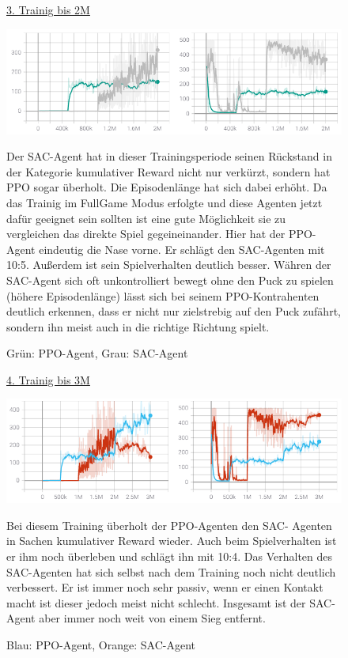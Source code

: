 \begin{figure} [h]
\underline{3. Trainig bis 2M} 

\includegraphics[width=\textwidth]{images/fullgame_erg}
\label{unity_agent}
\caption{Grün: PPO-Agent, Grau: SAC-Agent}


Der SAC-Agent hat in dieser Trainingsperiode seinen Rückstand in der Kategorie kumulativer Reward nicht nur verkürzt, sondern hat PPO sogar überholt. Die Episodenlänge hat sich dabei erhöht. Da das Trainig im FullGame Modus erfolgte und diese Agenten jetzt dafür geeignet sein sollten ist eine gute Möglichkeit sie zu vergleichen das direkte Spiel gegeineinander. Hier hat der PPO-Agent eindeutig die Nase vorne. Er schlägt den SAC-Agenten mit 10:5. Außerdem ist sein Spielverhalten deutlich besser. Währen der SAC-Agent sich oft unkontrolliert bewegt ohne den Puck zu spielen (höhere Episodenlänge) lässt sich bei seinem PPO-Kontrahenten deutlich erkennen, dass er nicht nur zielstrebig auf den Puck zufährt, sondern ihn meist auch in die richtige Richtung spielt. 
\end{figure}
\begin{figure} [h]
\underline{4. Trainig bis 3M} 

\includegraphics[width=\textwidth]{images/centered_erg}
\label{unity_agent}
\caption{Blau: PPO-Agent, Orange: SAC-Agent}


Bei diesem Training überholt der PPO-Agenten den SAC- Agenten in Sachen kumulativer Reward wieder. Auch beim Spielverhalten ist er ihm noch überleben und schlägt ihn mit 10:4. Das Verhalten des SAC-Agenten hat sich selbst nach dem Training noch nicht deutlich verbessert. Er ist immer noch sehr passiv, wenn er einen Kontakt macht ist dieser jedoch meist nicht schlecht. Insgesamt ist der SAC-Agent aber immer noch weit von einem Sieg entfernt.
\end{figure}
